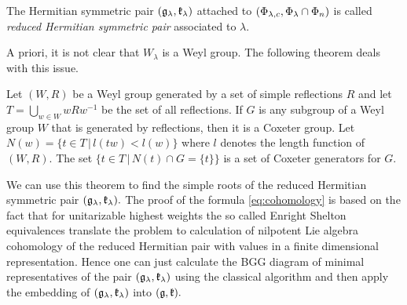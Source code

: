 \documentclass[12pt,a4paper,final]{report}
\begin{document}
\begin{definition}
 The Hermitian symmetric pair $(\mathfrak{g}_\lambda, \mathfrak{k}_\lambda)$ attached to $(\Phi_{\lambda,c}, \Phi_\lambda \cap \Phi_n)$ is called \emph{reduced Hermitian symmetric pair} associated to $\lambda$.
\end{definition}

A priori, it is not clear that $W_\lambda$ is a Weyl group. The following theorem deals with this issue. 

\begin{theorem}
	Let $(W, R)$ be a Weyl group generated by a set of simple reflections $R$ and let $T = \bigcup_{w \in W} wRw^{-1}$ be the set of all reflections. 
	If $G$ is any subgroup of a Weyl group $W$ that is generated by reflections, then it is a Coxeter group. Let $N(w) = \{ t \in T \, | \, l(tw) < l(w) \}$ where $l$ denotes the length function of $(W, R).$ The set $\{ t \in T \,|\, N(t) \cap G = \{t\} \}$ is a set of Coxeter generators for $G$.
\end{theorem}

We can use this theorem to find the simple roots of the reduced Hermitian symmetric pair $(\mathfrak{g}_\lambda, \mathfrak{k}_\lambda).$ The proof of the formula \eqref{eq:cohomology} is based on the fact that for unitarizable highest weights the so called Enright Shelton equivalences translate the problem to calculation of nilpotent Lie algebra cohomology of the reduced Hermitian pair with values in a finite dimensional representation. Hence one can just calculate the BGG diagram of minimal representatives of the pair $(\mathfrak{g}_\lambda, \mathfrak{k}_\lambda)$ using the classical algorithm and then apply the embedding of $(\mathfrak{g}_\lambda, \mathfrak{k}_\lambda)$ into $(\mathfrak{g}, \mathfrak{k}).$
\end{document}
